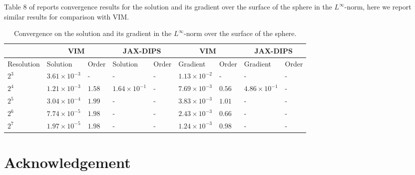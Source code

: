 \documentclass{elsarticle}
\begin{document}
Table 8 of \cite{guittet2015solving} reports convergence results for the solution and its gradient over the surface of the sphere in the $L^\infty$-norm, here we report similar results for comparison with VIM.


\begin{table}[ht]
\begin{center}
\begin{tabular}{|l||ll|ll|ll|ll|}
\hline
& \multicolumn{2}{c|}{VIM}& \multicolumn{2}{c|}{JAX-DIPS} & \multicolumn{2}{|c|}{VIM}& \multicolumn{2}{c|}{JAX-DIPS}\\
\hline
Resolution   &   Solution    &   Order   &   Solution   &   Order &   Gradient    &   Order   &   Gradient   &   Order  \\
\hline
$2^3$ & $3.61\times 10^{-3}$ & -         & - & - & $1.13\times 10^{-2}$ & - & - & - \\ 
$2^4$ & $1.21\times 10^{-3}$ & $1.58$    & $1.64\times 10^{-1}$ & - & $7.69\times 10^{-3}$ & $0.56$ & $4.86\times 10^{-1}$ & -\\ 
$2^5$ & $3.04\times 10^{-4}$ & $1.99$    & - & - & $3.83\times 10^{-3}$ & $1.01$ & - & -\\ 
$2^6$ & $7.74\times 10^{-5}$ & $1.98$    & - & - & $2.43\times 10^{-3}$ & $0.66$ & - & -\\ 
$2^7$ & $1.97\times 10^{-5}$ & $1.98$    & - & - & $1.24\times 10^{-3}$ & $0.98$ & - & -\\ \hline
\end{tabular}
\caption{Convergence on the solution and its gradient in the $L^\infty$-norm over the surface of the sphere.}
\end{center}
\end{table}




\section*{Acknowledgement}



\newpage


\end{document}
